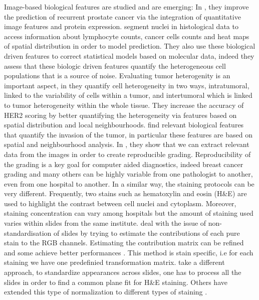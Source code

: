 \documentclass[a4paper,10pt]{article}
\begin{document}
Image-based biological features are studied and are emerging: In \citet{lee2015supervised}, they improve the prediction of recurrent prostate cancer via the integration of quantitative image features and protein expression. \citet{yuan2012quantitative} segment nuclei in histological data to access information about lymphocyte counts, cancer cells counts and heat maps of spatial distribution in order to model prediction.  They also use these biological driven features to correct statistical models based on molecular data, indeed they assess that these biologic driven features quantify the heterogeneous cell populations that is a source of noise. Evaluating tumor heterogenity is an important aspect, in \citet{potts2012evaluating} they quantify cell heterogeneity in two ways, intratumoral, linked to the variability of cells within a tumor, and intertumoral which is linked to tumor heterogeneity within the whole tissue. They increase the accuracy of HER2 scoring by better quantifying the heterogeneity via features based on spatial distribution and local neighbourhoods. \citet{harder2016cooccurence} find relevant biological features that quantify the invasion of the tumor, in particular these features are based on spatial and neighbourhood analysis. In \citet{petushi2006large}, they show that we can extract relevant data from the images in order to create reproducible grading. Reproducibility of the grading is a key goal for computer aided diagnostics, indeed breast cancer grading and many others can be highly variable from one pathologist to another, even from one hospital to another. In a similar way, the staining protocols can be very different. Frequently, two stains such as hematoxylin and eosin (H\&E) are used to highlight the contrast between cell nuclei and cytoplasm. Moreover, staining concentration can vary among hospitals but the amount of staining used varies within slides from the same institute. \citet{deconvolution} deal with the issue of non-standardisation of slides by trying to estimate the contributions of each pure stain to the RGB channels. Estimating the contribution matrix can be refined and some achieve better performances \citep{alsubaie2016}. This method is stain specific, i.e for each staining we have one predefinied transformation matrix. \citet{niethammer2010appearance} take a different approach, to standardize appearances across slides, one has to process all the slides in order to find a common plane fit for H\&E staining. Others have extended this type of normalization to different types of staining \citep{vanEycke2016}. 
\end{document}
